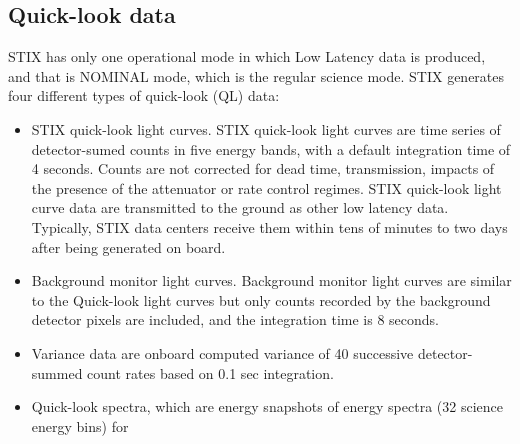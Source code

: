 \documentclass{aa}
\begin{document}
\subsection{Quick-look data}
STIX has only one operational mode in which Low Latency data is produced, and that is  NOMINAL mode, which is the regular science mode.
STIX generates four different types of quick-look (QL) data:
\begin{itemize}
\item STIX quick-look light curves. 
STIX quick-look light curves are time series of detector-sumed counts in five energy bands, with a default integration time of 4 seconds. 
Counts are not corrected for dead time,  transmission, impacts of the presence of the attenuator  or rate control regimes. 
STIX quick-look light curve data are transmitted to the ground as other low latency data. 
Typically, STIX data centers receive them within tens of minutes to two days after being generated on board.
\item Background monitor light curves. Background monitor light curves are similar to the Quick-look light curves but only
counts recorded by the background detector pixels are included, and the integration time is 8 seconds.
\item Variance data are onboard computed variance of 40 successive detector-summed count rates
based on 0.1 sec integration.
\item Quick-look spectra, which are energy snapshots of energy spectra (32 science energy bins) for

\end{itemize}
\end{document}
